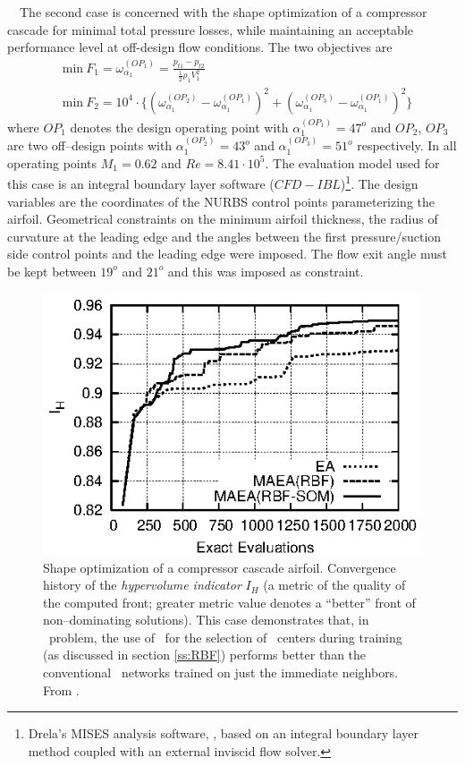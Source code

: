 \documentclass{vki_ls}
\newcommand{\xeraki}{\Pisymbol{ding}{13}~~}
\begin{document}
%
%
\xeraki The second case is concerned with the shape optimization of a compressor cascade for minimal total pressure losses, while maintaining an acceptable performance level at off-design flow conditions.
The two objectives are 
%
\begin{align}
    &\mbox{min}~F_1 =  \omega_{\alpha_1}^{(OP_1)} =
            \frac{p_{t1}-p_{t2}}{\frac{1}{2} \rho_1 V_1^2}
    \nonumber \\
    &\mbox{min}~F_2 = 10^4 \cdot \{
    ( \omega_{\alpha_1}^{(OP_2)}-\omega_{\alpha_1}^{(OP_1)} )^2 +
    ( \omega_{\alpha_1}^{(OP_3)}-\omega_{\alpha_1}^{(OP_1)} )^2
    \}
    \nonumber
\end{align}
%
where $OP_1$ denotes the design operating point with 
$\alpha_1^{(OP_1)}\!=\!47^o$ and $OP_2$, $OP_3$ are two off--design
points with $\alpha_1^{(OP_2)}\!=\!43^o$ and $\alpha_1^{(OP_3)}\!=\!51^o$
respectively. In all operating points $M_1\!=\!0.62$ and $Re\!=\!8.41\cdot10^5$. 
The evaluation model used for this case is an integral boundary layer software ($CFD-IBL$)\footnote{Drela's MISES analysis software, \cite{Drel1987}, based on an integral boundary layer method coupled with an external inviscid flow solver.}. 
The design variables are the coordinates of the NURBS control points parameterizing the airfoil. 
Geometrical constraints on the minimum airfoil thickness, the radius of curvature at the leading edge and the angles between the first pressure/suction side control points and the leading edge were imposed. 
The flow exit angle must be kept between $19^o$ and $21^o$ and this was imposed as constraint. 

%
\begin{figure}[!ht]
    \centering
    \includegraphics[scale=1.5]{maeas/manConv.eps}
    \caption{Shape optimization of a compressor cascade airfoil. Convergence
             history of the \textit{hypervolume indicator} $I_H$ (a metric of 
             the quality of the computed front; greater metric value 
	     denotes a ``better'' front of non--dominating solutions).
             This case demonstrates that, in \MOO\ problem, the use of 
             \SOMs\ for the selection of \RBF\ centers during training
             (as discussed in section \ref{ss:RBF}) performs better than 
             the conventional \RBF\ networks trained on just the immediate 
	     neighbors. From \cite{LTT_3_075}.}
    \label{f:manConv}
\end{figure}
\end{document}
